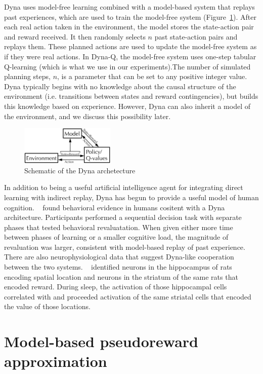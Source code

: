 \documentclass[letterpaper]{article}
\begin{document}
Dyna uses model-free learning combined with a model-based system that replays past experiences, which are used to train the model-free system (Figure~\ref{fig:dyna_schematic}). After each real action taken in the environment, the model stores the state-action pair and reward received. It then randomly selects $n$ past state-action pairs and replays them. These planned actions are used to update the model-free system as if they were real actions. In Dyna-Q, the model-free system uses one-step tabular Q-learning (which is what we use in our experiments).The number of simulated planning steps, $n$, is a parameter that can be set to any positive integer value. Dyna typically begins with no knowledge about the causal structure of the environment (i.e. transitions between states and reward contingencies), but builds this knowledge based on experience. However, Dyna can also inherit a model of the environment, and we discuss this possibility later.

\begin{figure}[ht]
\centering
\includegraphics[width=0.4\textwidth]{dyna_schematic}
\caption{Schematic of the Dyna archetecture}
\label{fig:dyna_schematic}
\end{figure}

In addition to being a useful artificial intelligence agent for integrating direct learning with indirect replay, Dyna has begun to provide a useful model of human cognition. ~\cite{gershman2014retrospective} found behavioral evidence in humans cositent with a Dyna architecture.  Participants performed a sequential decision task with separate phases that tested behavioral revaluatation. When given either more time between phases of learning or a smaller cognitive load, the magnitude of revaluation was larger, consistent with model-based replay of past experience. There are also neurophysiological data that suggest Dyna-like cooperation between the two systems. ~\cite{lansink2009hippocampus} identified neurons in the hippocampus of rats encoding spatial location and neurons in the striatum of the same rats that encoded reward. During sleep, the activation of those hippocampal cells correlated with and proceeded activation of the same striatal cells that encoded the value of those locations.

\section{Model-based pseudoreward approximation}
\end{document}
